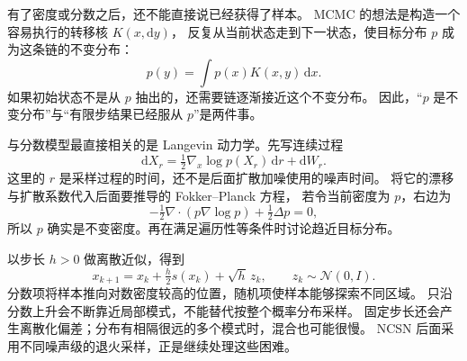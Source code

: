 有了密度或分数之后，还不能直接说已经获得了样本。
MCMC 的想法是构造一个容易执行的转移核 $K(x,\mathrm dy)$，
反复从当前状态走到下一状态，使目标分布 $p$ 成为这条链的不变分布：
\[
p(y)=\int p(x)K(x,y)\,\mathrm dx.
\]
如果初始状态不是从 $p$ 抽出的，还需要链逐渐接近这个不变分布。
因此，“$p$ 是不变分布”与“有限步结果已经服从 $p$”是两件事。

与分数模型最直接相关的是 Langevin 动力学。先写连续过程
\[
\mathrm dX_r=\tfrac12\nabla_x\log p(X_r)\,\mathrm dr+\mathrm dW_r.
\]
这里的 $r$ 是采样过程的时间，还不是后面扩散加噪使用的噪声时间。
将它的漂移与扩散系数代入后面要推导的 Fokker--Planck 方程，
若令当前密度为 $p$，右边为
\[
-\tfrac12\nabla\cdot(p\nabla\log p)+\tfrac12\Delta p=0,
\]
所以 $p$ 确实是不变密度。再在满足遍历性等条件时讨论趋近目标分布。

以步长 $h>0$ 做离散近似，得到
\[
x_{k+1}=x_k+\tfrac h2 s(x_k)+\sqrt h\,z_k,
\qquad z_k\sim\mathcal N(0,I).
\]
分数项将样本推向对数密度较高的位置，随机项使样本能够探索不同区域。
只沿分数上升会不断靠近局部模式，不能替代按整个概率分布采样。
固定步长还会产生离散化偏差；分布有相隔很远的多个模式时，混合也可能很慢。
NCSN 后面采用不同噪声级的退火采样，正是继续处理这些困难。

